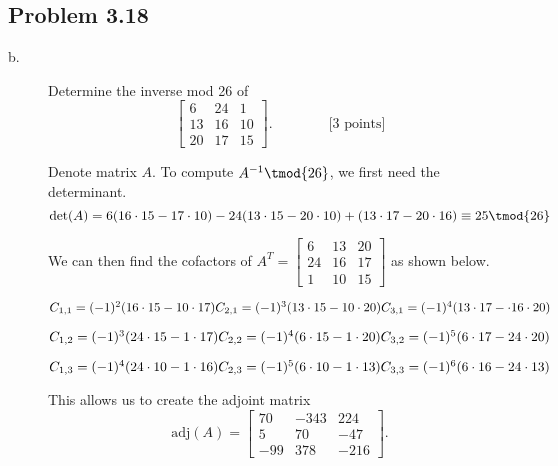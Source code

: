 \documentclass[../hw_sols.tex]{subfiles}
\begin{document}
\subsection*{Problem 3.18}

\begin{description}

\item[b.] Determine the inverse mod 26 of
	$$\begin{bmatrix}
		6  & 24 &  1 \\ 
		13 & 16 & 10 \\ 
		20 & 17 & 15
	\end{bmatrix}
	. \qquad\qquad \text{[3 points]}$$

\begin{solution}

Denote matrix $A$. To compute $A^{-1} \tmod{26}$, we first need the 
determinant.
	$$\det(A) = 
	6(16 \cdot 15 - 17 \cdot 10) 
	- 24(13 \cdot 15 - 20 \cdot 10) 
	+ (13 \cdot 17 - 20 \cdot 16) 
	\equiv 25 \tmod{26}$$

We can then find the cofactors of 
	$A^T = 
	\begin{bmatrix}
		 6 & 13 & 20 \\ 
		24 & 16 & 17 \\ 
		 1 & 10 & 15
	\end{bmatrix}$
as shown below.
	
\begin{multicols}{3}
	$C_{1,1} = (-1)^2(16 \cdot 15 - 10 \cdot 17) \\
	C_{2,1} = (-1)^3(13 \cdot 15 - 10 \cdot 20)  \\
	C_{3,1} = (-1)^4(13 \cdot 17 - \cdot 16 \cdot 20)$
	
	$C_{1,2} = (-1)^3(24 \cdot 15 - 1 \cdot 17) \\
	C_{2,2} = (-1)^4(6 \cdot 15 - 1 \cdot 20)   \\
	C_{3,2} = (-1)^5(6 \cdot 17 - 24 \cdot 20)$
	
	$C_{1,3} = (-1)^4(24 \cdot 10 - 1 \cdot 16) \\
	C_{2,3} = (-1)^5(6 \cdot 10 - 1 \cdot 13)   \\
	C_{3,3} = (-1)^6(6 \cdot 16 - 24 \cdot 13)$
\end{multicols}

This allows us to create the adjoint matrix
	$$\text{adj}(A) =
	\begin{bmatrix}
		 70 & -343 &  224 \\ 
		  5 &   70 &  -47 \\ 
		-99 &  378 & -216
	\end{bmatrix}.$$


\end{solution}
\end{description}
\end{document}
